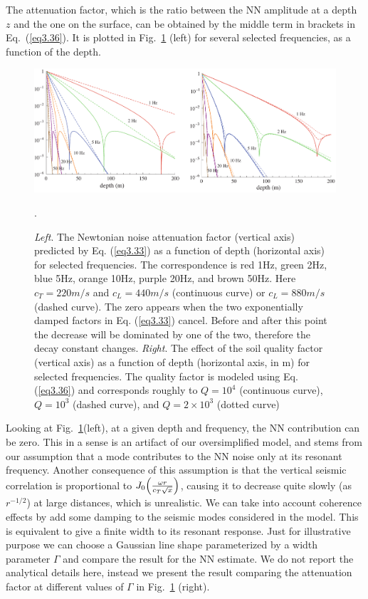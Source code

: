 The attenuation factor, which is the ratio between the NN amplitude at a depth $z$ and the one on the surface, can be obtained by the middle term in brackets in Eq.~(\ref{eq3.36}). It is plotted in Fig.~\ref{fig3.8} (left) for several selected frequencies, as a function of the depth.
\begin{figure}[t]
	\begin{center} 
		\includegraphics[width=16.5cm]{./Sec_SiteInfra/Figures/CellaNNTF.pdf} 
		\caption{{\em Left}. The Newtonian noise attenuation factor (vertical axis) predicted by Eq. (\ref{eq3.33}) as a function of depth (horizontal axis) for selected frequencies. The correspondence is red 1Hz, green 2Hz, blue 5Hz, orange 10Hz, purple 20Hz, and brown 50Hz. Here $c_{T}=220m/s$ and $c_{L}=440m/s$ (continuous curve) or $c_{L}=880m/s$ (dashed curve). The zero appears when the two exponentially damped factors in Eq. (\ref{eq3.33}) cancel. Before and after this point the decrease will be dominated by one of the two, therefore the decay constant changes. {\em Right}. The effect of the soil quality factor (vertical axis) as a function of depth (horizontal axis, in m) for selected frequencies. The quality factor is modeled using Eq. (\ref{eq3.36}) and corresponds roughly to $Q=10^{4}$ (continuous curve), $Q=10^{3}$ (dashed curve), and $Q=2\times10^{3}$ (dotted curve)}.  
		\label{fig3.8} 
	\end{center}
\end{figure}

Looking at Fig.~\ref{fig3.8}(left), at a given depth and frequency, the NN
contribution can be zero. This in a sense is an artifact of our oversimplified
model, and stems from our assumption that a mode contributes to the NN noise
only at its resonant frequency. Another consequence of this assumption is that
the vertical seismic correlation is proportional to $J_{0}\Big{(}\frac{\omega
r}{c_{T}\sqrt{x}}\Big{)}$, causing it to decrease quite slowly (as $r^{-1/2}$)
at large distances, which is unrealistic. We can take into account coherence
effects by add some damping to the seismic modes considered in the model. This
is equivalent to give a finite width to its resonant response. Just for
illustrative purpose we can choose a Gaussian line shape parameterized by a
width parameter $\Gamma$ and compare the result for the NN estimate. We do not
report the analytical details here, instead we present the result comparing
the attenuation factor at different values of $\Gamma$ in Fig.~\ref{fig3.8}
(right).

